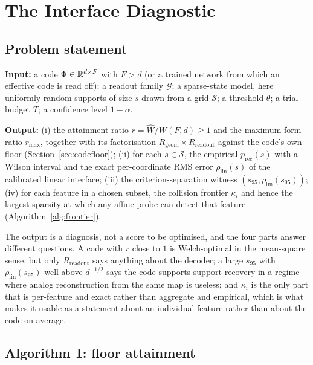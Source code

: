 \section{The Interface Diagnostic}
\label{sec:method}

\subsection{Problem statement}

\begin{problem}
\label{prob:main}
\textbf{Input:} a code $\Phi\in\mathbb{R}^{d\times F}$ with $F>d$ (or a trained network from which an
effective code is read off); a readout family $\mathcal G$; a sparse-state model, here
uniformly random supports of size $s$ drawn from a grid $\mathcal S$; a threshold $\theta$; a
trial budget $T$; a confidence level $1-\alpha$.

\textbf{Output:} (i) the attainment ratio $r=\widehat W/W(F,d)\ge1$ and the maximum-form ratio
$r_{\max}$, together with its factorisation $R_{\mathrm{geom}}\times R_{\mathrm{readout}}$
against the code's own floor (Section~\ref{sec:codefloor}); (ii) for each $s\in\mathcal S$, the
empirical $p_{\mathrm{rec}}(s)$ with a Wilson interval and the exact per-coordinate RMS error
$\rho_{\mathrm{lin}}(s)$ of the calibrated linear interface; (iii) the criterion-separation
witness $(s_{95},\rho_{\mathrm{lin}}(s_{95}))$; (iv) for each feature in a chosen subset, the
collision frontier $\kappa_i$ and hence the largest sparsity at which any affine probe can
detect that feature (Algorithm~\ref{alg:frontier}).
\end{problem}

The output is a diagnosis, not a score to be optimised, and the four parts answer different
questions. A code with $r$ close to $1$ is Welch-optimal in the mean-square sense, but only
$R_{\mathrm{readout}}$ says anything about the decoder; a large $s_{95}$ with
$\rho_{\mathrm{lin}}(s_{95})$ well above $d^{-1/2}$ says the code supports support recovery in a
regime where analog reconstruction from the same map is useless; and $\kappa_i$ is the only part
that is per-feature and exact rather than aggregate and empirical, which is what makes it usable
as a statement about an individual feature rather than about the code on average.

\subsection{Algorithm 1: floor attainment}

